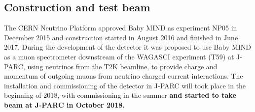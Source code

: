 

\subsection{Construction and test beam}

The CERN Neutrino Platform approved Baby MIND as experiment NP05 in December 2015 and construction started in August 2016 and finished in June 2017. During the development of the detector it was proposed to use Baby MIND as a muon spectrometer downstream of the WAGASCI experiment (T59) at J-PARC, using neutrinos from the T2K beamline, to provide charge and momentum of outgoing muons from neutrino charged current interactions. The installation and commissioning of the detector in J-PARC will took place in the beginning of 2018, with commissioning in the summer  \textbf{and started to take beam at J-PARC in October 2018.}

